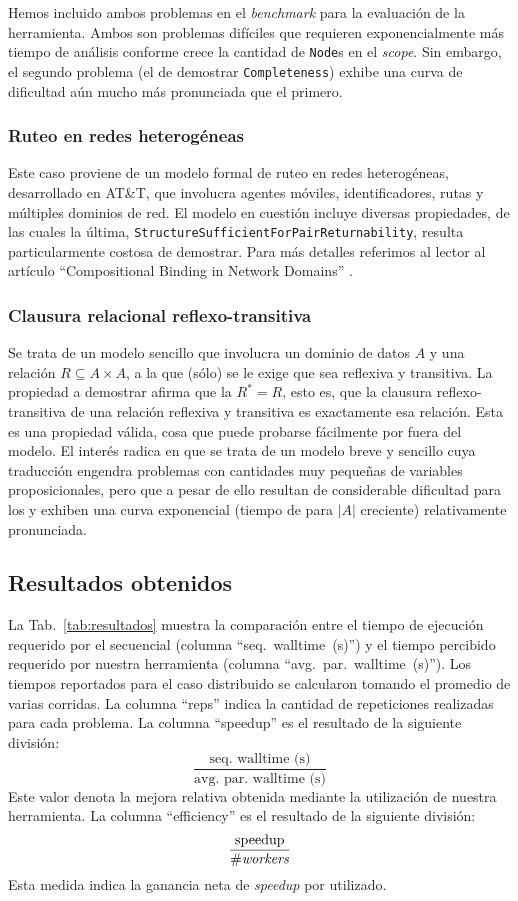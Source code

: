 Hemos incluido ambos problemas en el \emph{benchmark} para la evaluación de la herramienta. Ambos son problemas difíciles que requieren exponencialmente más tiempo de análisis conforme crece la cantidad de \texttt{Node}s en el \emph{scope}. Sin embargo, el segundo problema (el de demostrar \texttt{Completeness}) exhibe una curva de dificultad aún mucho más pronunciada que el primero.


\subsubsection{Ruteo en redes heterogéneas}

Este caso proviene de un modelo formal de ruteo en redes heterogéneas, desarrollado en AT\&T, que involucra agentes móviles, identificadores, rutas y múltiples dominios de red. El modelo en cuestión incluye diversas propiedades, de las cuales la última, \texttt{StructureSufficientForPairReturnability}, resulta particularmente costosa de demostrar. Para más detalles referimos al lector al artículo ``Compositional Binding in Network Domains'' \cite{paperPamela??}.


\subsubsection{Clausura relacional reflexo-transitiva}

Se trata de un modelo sencillo que involucra un dominio de datos $A$ y una relación $R \subseteq A \times A$, a la que (sólo) se le exige que sea reflexiva y transitiva. La propiedad a demostrar afirma que la $R^{*} = R$, esto es, que la clausura reflexo-transitiva de una relación reflexiva y transitiva es exactamente esa relación. Esta es una propiedad válida, cosa que puede probarse fácilmente por fuera del modelo. El interés radica en que se trata de un modelo breve y sencillo cuya traducción engendra problemas con cantidades muy pequeñas de variables proposicionales, pero que a pesar de ello resultan de considerable dificultad para los \ssolvers y exhiben una curva exponencial (tiempo de \solving para $|A|$ creciente) relativamente pronunciada.


\subsection{Resultados obtenidos}


La Tab.~\ref{tab:resultados} muestra la comparación entre el tiempo de
ejecución requerido por el \ssolver secuencial (columna ``seq.~walltime~(s)'')
y el tiempo percibido requerido por nuestra herramienta (columna
``avg.~par.~walltime~(s)''). Los tiempos reportados para el caso distribuido
se calcularon tomando el promedio de varias corridas. La columna ``reps''
indica la cantidad de repeticiones realizadas para cada problema. La columna
``speedup'' es el resultado de la siguiente división:
$$\frac{\text{seq.~walltime~(s)}}{\text{avg.~par.~walltime~(s)}}$$ Este valor
denota la mejora relativa obtenida mediante la utilización de nuestra
herramienta. La columna ``efficiency'' es el resultado de la siguiente división:
$$\frac{\text{speedup}}{\text{\#\emph{workers}}}$$
Esta medida indica la ganancia neta de \emph{speedup} por \w utilizado.

